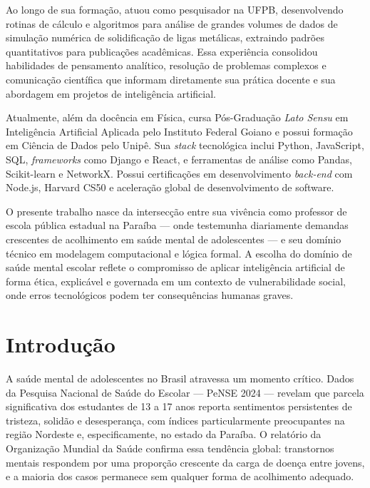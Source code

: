 \documentclass[
    12pt,
    openright,
    oneside,
    a4paper,
    english,
    brazil
]{abntex2}
\begin{document}
Ao longo de sua forma\c{c}\~ao, atuou como pesquisador na UFPB, desenvolvendo rotinas de c\'alculo e algoritmos para an\'alise de grandes volumes de dados de simula\c{c}\~ao num\'erica de solidifica\c{c}\~ao de ligas met\'alicas, extraindo padr\~oes quantitativos para publica\c{c}\~oes acad\^emicas. Essa experi\^encia consolidou habilidades de pensamento anal\'itico, resolu\c{c}\~ao de problemas complexos e comunica\c{c}\~ao cient\'ifica que informam diretamente sua pr\'atica docente e sua abordagem em projetos de intelig\^encia artificial.

Atualmente, al\'em da doc\^encia em F\'isica, cursa P\'os-Gradua\c{c}\~ao \textit{Lato Sensu} em Intelig\^encia Artificial Aplicada pelo Instituto Federal Goiano e possui forma\c{c}\~ao em Ci\^encia de Dados pelo Unip\^e. Sua \textit{stack} tecnol\'ogica inclui Python, JavaScript, SQL, \textit{frameworks} como Django e React, e ferramentas de an\'alise como Pandas, Scikit-learn e NetworkX. Possui certifica\c{c}\~oes em desenvolvimento \textit{back-end} com Node.js, Harvard CS50 e acelera\c{c}\~ao global de desenvolvimento de software.

O presente trabalho nasce da intersec\c{c}\~ao entre sua viv\^encia como professor de escola p\'ublica estadual na Para\'iba --- onde testemunha diariamente demandas crescentes de acolhimento em sa\'ude mental de adolescentes --- e seu dom\'inio t\'ecnico em modelagem computacional e l\'ogica formal. A escolha do dom\'inio de sa\'ude mental escolar reflete o compromisso de aplicar intelig\^encia artificial de forma \'etica, explic\'avel e governada em um contexto de vulnerabilidade social, onde erros tecnol\'ogicos podem ter consequ\^encias humanas graves.

\chapter{Introdu\c{c}\~ao}

A sa\'ude mental de adolescentes no Brasil atravessa um momento cr\'itico. Dados da Pesquisa Nacional de Sa\'ude do Escolar --- PeNSE 2024 \cite{ibge_pense_2024} --- revelam que parcela significativa dos estudantes de 13 a 17 anos reporta sentimentos persistentes de tristeza, solid\~ao e desesperan\c{c}a, com \'indices particularmente preocupantes na regi\~ao Nordeste e, especificamente, no estado da Para\'iba. O relat\'orio da Organiza\c{c}\~ao Mundial da Sa\'ude \cite{who_mental_health_2022} confirma essa tend\^encia global: transtornos mentais respondem por uma propor\c{c}\~ao crescente da carga de doen\c{c}a entre jovens, e a maioria dos casos permanece sem qualquer forma de acolhimento adequado.
\end{document}
